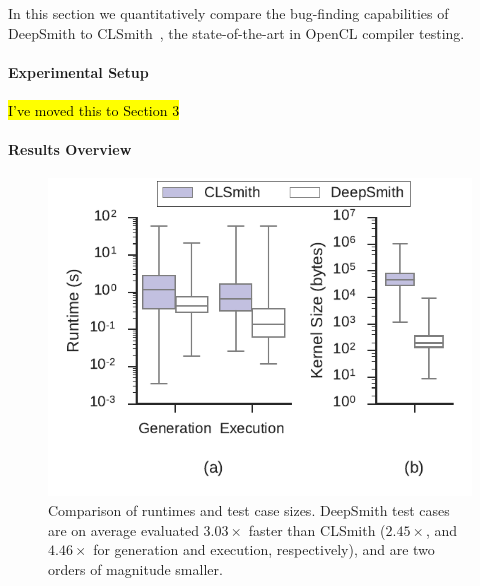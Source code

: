 In this section we quantitatively compare the bug-finding capabilities of DeepSmith to CLSmith~\cite{Lidbury2015a}, the state-of-the-art in OpenCL compiler testing.

\paragraph{Experimental Setup} \hl{I've moved this to Section 3}

\paragraph{Results Overview}

\begin{table}
  \scriptsize %
  \centering %
  
  \caption{%
    Results from 48 hours of testing using CLSmith and DeepSmith. Testbed \#. as per Table~\ref{tab:platforms}. $\pm$ denotes optimizations off ($-$) vs on ($+$). The remaining columns denote the number of build crash (\textbf{bc}), build timeout (\textbf{bto}), build failure (\textbf{bf}), runtime crash (\textbf{c}), wrong-output (\textbf{w}), and pass (\textbf{\cmark}) results. %
  }
  \label{tab:megatable}
\end{table}

\begin{figure}
  \centering %
  \includegraphics[width=\columnwidth]{build/img/vs-clsmith}%
  \vspace{-1em}
  \caption{%
    Comparison of runtimes and test case sizes. DeepSmith test cases are on average evaluated $3.03\times$ faster than CLSmith ($2.45\times$, and $4.46\times$ for generation and execution, respectively), and are two orders of magnitude smaller.
  }%
  \label{fig:vs-clsmith} %
\end{figure}

